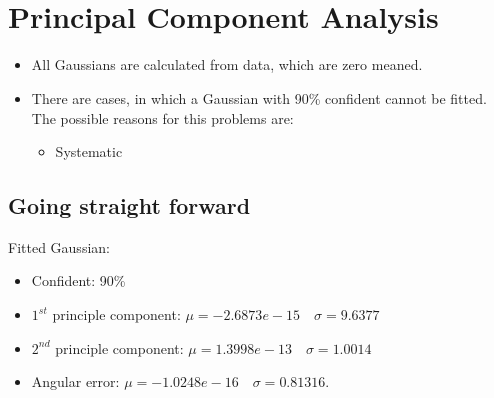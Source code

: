 \documentclass[paper=a4, fontsize=11pt]{scrartcl} %
\title{\hmwkClass \\
       \hmwkTitle}
\author{\hmwkAuthorFullName}
\date{\hmwkDueDate}
\begin{document}
    \maketitle
    \thispagestyle{fancy} %
    
    \section{Principal Component Analysis}
    \begin{itemize}
    	\item All Gaussians are calculated from data, which are zero meaned.
        \item There are cases, in which a Gaussian with 90\% confident cannot be fitted. The possible reasons for this problems are:
        \begin{itemize}
        	\item Systematic  
        \end{itemize}

    \end{itemize}

    \subsection{Going straight forward}
    Fitted Gaussian:
    \begin{itemize}
    	\item Confident: 90\%
	    \item $1^{st}$ principle component: $\mu = -2.6873e-15 \quad \sigma = 9.6377$
	    \item $2^{nd}$ principle component: $\mu = 1.3998e-13 \quad \sigma = 1.0014$
	    \item Angular error: $\mu = -1.0248e-16 \quad \sigma = 0.81316$.
    \end{itemize}
    
\end{document}
